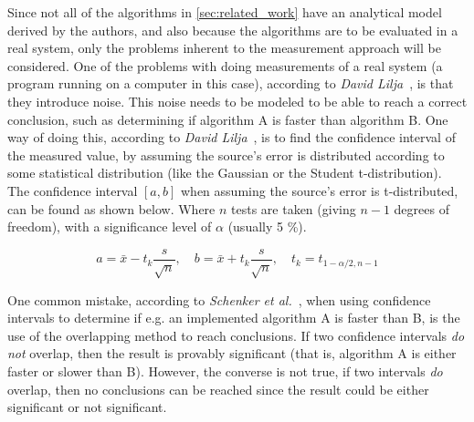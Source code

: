 Since not all of the algorithms in \cref{sec:related_work} have an analytical model derived by the authors, and also because the algorithms are to be evaluated in a real system, only the problems inherent to the measurement approach will be considered. One of the problems with doing measurements of a real system (a program running on a computer in this case), according to \emph{David Lilja}~\cite[p.~43]{lilja2005measuring}, is that they introduce noise. This noise needs to be modeled to be able to reach a correct conclusion, such as determining if algorithm A is faster than algorithm B. One way of doing this, according to \emph{David Lilja}~\cite[p.~48]{lilja2005measuring}, is to find the confidence interval of the measured value, by assuming the source's error is distributed according to some statistical distribution (like the Gaussian or the Student t-distribution). The confidence interval \([a,b]\) when assuming the source's error is t-distributed, can be found as shown below. Where \(n\) tests are taken (giving \(n-1\) degrees of freedom), with a significance level of \(\alpha\) (usually 5 \%).

\begin{equation} a = \bar{x} - t_k\frac{s}{\sqrt{n}}, \quad
   b = \bar{x} + t_k\frac{s}{\sqrt{n}}, \quad
t_k = t_{1-\alpha/2,n-1} \end{equation}

One common mistake, according to \emph{Schenker et al.}~\cite{schenker2001judging}, when using confidence intervals to determine if e.g. an implemented algorithm A is faster than B, is the use of the overlapping method to reach conclusions. If two confidence intervals \emph{do not} overlap, then the result is provably significant (that is, algorithm A is either faster or slower than B). However, the converse is not true, if two intervals \emph{do} overlap, then no conclusions can be reached since the result could be either significant or not significant.


